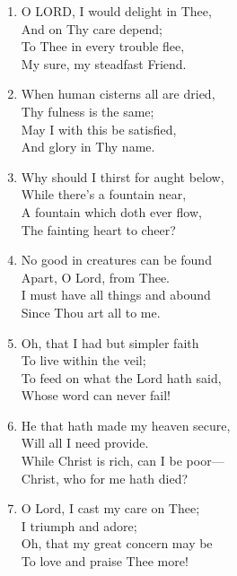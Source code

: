 \begin{enumerate}
    \item O LORD, I would delight in Thee, \\
        And on Thy care depend; \\
        To Thee in every trouble flee, \\
        My sure, my steadfast Friend.

    \item When human cisterns all are dried, \\
        Thy fulness is the same; \\
        May I with this be satisfied, \\
        And glory in Thy name.

    \item Why should I thirst for aught below, \\
        While there's a fountain near, \\
        A fountain which doth ever flow, \\
        The fainting heart to cheer?

    \item No good in creatures can be found \\
        Apart, O Lord, from Thee. \\
        I must have all things and abound \\
        Since Thou art all to me.

    \item Oh, that I had but simpler faith \\
        To live within the veil; \\
        To feed on what the Lord hath said, \\
        Whose word can never fail!

    \item He that hath made my heaven secure, \\
        Will all I need provide. \\
        While Christ is rich, can I be poor--- \\
        Christ, who for me hath died?

    \item O Lord, I cast my care on Thee; \\
        I triumph and adore; \\
        Oh, that my great concern may be \\
        To love and praise Thee more!

\end{enumerate}

